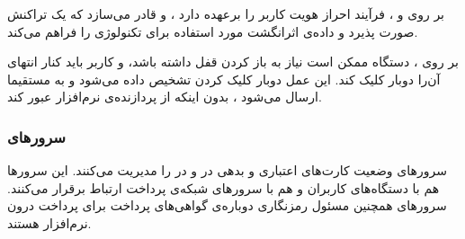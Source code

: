 \documentclass[oneside]{report}
\begin{document}
         \subsubsection{{\small {}}}
                       {\normalsize {}}
    بر روی
               {\normalsize {}} و
                          {\normalsize {}}
                          ، 
                                     {\normalsize {}}
    فرآیند احراز هویت کاربر را برعهده دارد ، و قادر می‌سازد که یک تراکنش صورت پذیرد و داده‌ی اثرانگشت مورد استفاده برای تکنولوژی 
               {\normalsize {}}
               را فراهم می‌کند. 
               
   بر روی 
              {\normalsize {}}
              ، دستگاه ممکن است نیاز به باز کردن قفل داشته باشد، و کاربر باید کنار انتهای آن‌را دوبار کلیک کند. این عمل دوبار کلیک کردن تشخیص داده می‌شود و به 
                         {\normalsize {}}
                      مستقیما   ارسال می‌شود ، بدون اینکه از پردازنده‌ی نرم‌افزار عبور کند.
                      
      \subsubsection{سرورهای{\small {}}} 
      سرورهای 
   {\normalsize {}}
   وضعیت کارت‌های اعتباری و بدهی در 
   {\normalsize {}}
   و 
   {\normalsize {}}
   در 
   {\normalsize {}}
   را مدیریت می‌کنند. این سرورها هم با دستگاه‌‌های کاربران و هم با سرورهای شبکه‌ی پرداخت ارتباط برقرار می‌کنند.
   سرور‌های 
   {\normalsize {}}
   همچنین مسئول رمزنگاری دوباره‌ی گواهی‌های پرداخت 
         					برای پرداخت درون نرم‌افزار           
   هستند. 
               
\end{document}
